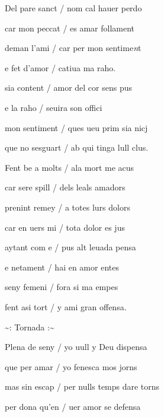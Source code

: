 \documentclass[12pt]{article}
\begin{document}
\begin{estrofa}

 Del pare sanct / nom cal hauer perdo

 car mon peccat / es amar follament

 deman l'ami / car per mon sentime\textit{n}t

 e fet d'amor / catiua ma raho.

 sia content / amor del cor sens pus

 e la raho / seuira son offici

 mon sentiment / ques ueu prim sia nicj

 que no sesguart / ab qui tinga lull clus.

\end{estrofa}



\begin{estrofa}

 Fent be a molts / ala mort me acus

 car sere spill / dels leals amadors

 prenint remey / a totes lurs dolors

 car en uers mi / tota dolor es jus

 aytant com e / pus alt leuada pensa

 e netament / hai en amor entes

 seny femeni / fora si ma empes

 fent asi tort / y ami gran offensa.

\end{estrofa}


\begin{estrofaExtra}%




\begin{tornada}

\pagina{[69r]} \textasciitilde{}: Tornada
:\textasciitilde{}

\end{tornada}


\end{estrofaExtra}


\begin{estrofa}

 Plena de seny / yo uull y Deu dispensa

 que per amar / yo fenesca mos jorns

 mas sin escap / per nulls temps dare torns

 per dona qu'en / uer amor se defensa

\end{estrofa}
\end{document}
